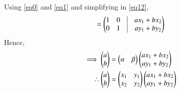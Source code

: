 \documentclass[journal,12pt,twocolumn]{IEEEtran}
\begin{document}
Using \ref{eq0} and \ref{eq1} and simplifying in \ref{eq12},
\begin{align}
=\myvec{1&0&\vrule&ax_1+bx_2\\0&1&\vrule&ay_1+by_2}
\end{align}
Hence,
\begin{align}
\implies \begin{pmatrix}a\\b\end{pmatrix}&=\begin{pmatrix}\alpha & \beta\end{pmatrix}\begin{pmatrix}ax_1+bx_2\\ay_1+by_2\end{pmatrix}\\
 \therefore \begin{pmatrix}a\\b\end{pmatrix}&=\begin{pmatrix}x_1&y_1 \\ x_2&y_2\end{pmatrix}\begin{pmatrix}ax_1+bx_2\\ay_1+by_2\end{pmatrix}
\end{align}
\end{document}
